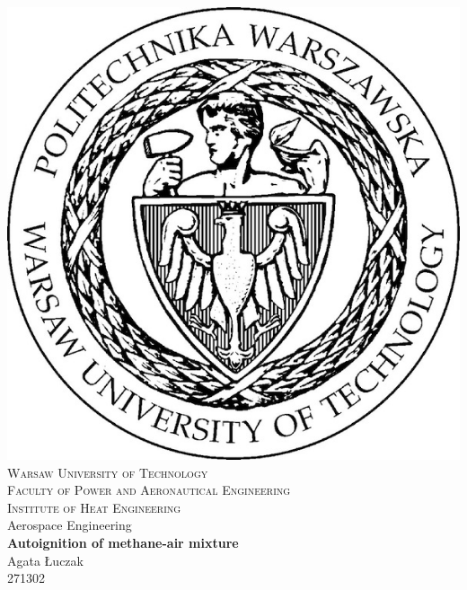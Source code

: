 \newpage
\thispagestyle{empty}


\begin{center}
\centering
\includegraphics[keepaspectratio,scale=2]{WUT_logo.jpeg} \\[1.0cm]
{\fontsize{17}{17}\selectfont
\textsc{Warsaw University of Technology \\[1.5cm]
Faculty of Power and Aeronautical Engineering  \\[.5cm]
Institute of Heat Engineering  \\[1.0cm]}
\huge{Aerospace Engineering \\[1.7cm]}}
\fontsize{30}{30}\selectfont
\textbf{Autoignition of methane-air mixture \\[3.0cm]}
\huge{Agata Łuczak \\ 271302}
\end{center}
